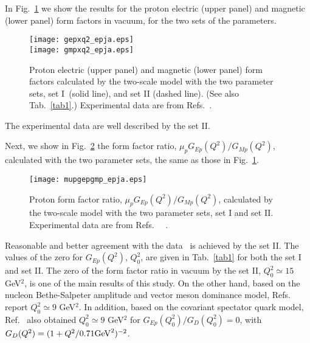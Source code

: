 \documentclass[preprint,aps,showpacs,floatfix]{revtex4}
\begin{document}
In Fig.~\ref{gepgmp} we show the results for the proton electric (upper panel)  
and magnetic (lower panel) form factors in vacuum, for the two sets of the parameters. 
\begin{figure}[htbp]
\texttt{[image: gepxq2\_epja.eps]}
\\
\vspace*{1.5cm}
\texttt{[image: gmpxq2\_epja.eps]}
\caption{Proton electric (upper panel) and magnetic (lower panel) form factors 
calculated by the two-scale model with the two parameter sets, 
set I~(solid line), and set II (dashed line).  
(See also Tab.~\ref{tab1}.)
Experimental data are from 
Refs.~\cite{Jones2000,Gayou2002,Punjabi2005,Ron2007,Puckett2010,Ron2011,Puckett2012,Holer1976,Gao2003}.
}
\label{gepgmp}
\end{figure}
The experimental data are well described by the set II. 

Next, we show in Fig.~\ref{gepmratio} the form factor ratio, 
$\mu_pG_{Ep}(Q^2)/G_{Mp}(Q^2)$, calculated with the two parameter sets, 
the same as those in Fig.~\ref{gepgmp}. 
\begin{figure}[htbp]
\texttt{[image: mupgepgmp\_epja.eps]}
\caption{
Proton form factor ratio, $\mu_pG_{Ep}(Q^2)/G_{Mp}(Q^2)$, calculated by 
the two-scale model with the two parameter sets, set I and set II.
Experimental data are from Refs.~~\cite{Jones2000,Gayou2002,Punjabi2005,Ron2007,Puckett2010,Ron2011,Puckett2012} 
.}
\label{gepmratio}
\end{figure}
Reasonable and better agreement with the 
data~\cite{Jones2000,Gayou2002,Punjabi2005,Ron2007,Puckett2010,Ron2011,Puckett2012} is achieved 
by the set II. 
The values of the zero for $G_{Ep}(Q^2)$, $Q_0^2$, are given in Tab.~\ref{tab1} 
for both the set I and set II. The zero of the form factor ratio in vacuum by the set II, 
$Q^2_0 \simeq 15$ GeV$^2$, is one of the main results of this study.
On the other hand, based on the nucleon Bethe-Salpeter amplitude and vector meson dominance model, 
Refs.~\cite{Q02,Q03} report $Q_0^2 \simeq 9$ GeV$^2$. 
In addition, based on the covariant spectator quark model, Ref.~\cite{GilbertoQ0} 
also obtained $Q_0^2 \simeq 9$ GeV$^2$ for $G_{Ep}(Q_0^2)/G_D(Q_0^2) = 0$, with 
$G_D(Q^2) = (1 + Q^2/0.71{\rm GeV}^2)^{-2}$.
\end{document}

